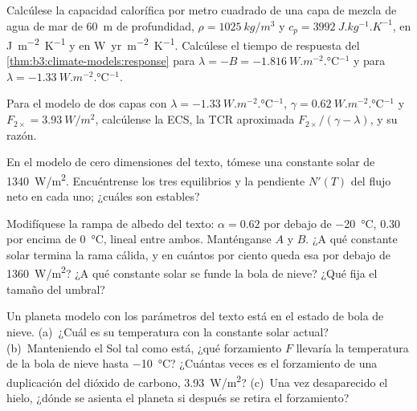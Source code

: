\begin{exercise}[$\star$]\label{exo:b3:climate-models:3}
Calcúlese la capacidad calorífica por metro cuadrado de una capa de mezcla de agua de mar
de \qty{60}{m} de profundidad, $\rho = \qty{1025}{kg/m^3}$ y $c_p = \qty{3992}{J.kg^{-1}.K^{-1}}$,
en \unit{J.m^{-2}.K^{-1}} y en \unit{W.yr.m^{-2}.K^{-1}}. Calcúlese el
tiempo de respuesta del \cref{thm:b3:climate-models:response} para $\lambda = -B =
\qty{-1.816}{W.m^{-2}.\celsius^{-1}}$ y para $\lambda =
\qty{-1.33}{W.m^{-2}.\celsius^{-1}}$.
\end{exercise}

\begin{exercise}[$\star$]\label{exo:b3:climate-models:4}
Para el modelo de dos capas con $\lambda = \qty{-1.33}{W.m^{-2}.\celsius^{-1}}$,
$\gamma = \qty{0.62}{W.m^{-2}.\celsius^{-1}}$ y $F_{2\times} =
\qty{3.93}{W/m^2}$, calcúlense la ECS, la TCR aproximada $F_{2\times}/
(\gamma - \lambda)$, y su razón.
\end{exercise}

\begin{exercise}[$\star\star$]\label{exo:b3:climate-models:5}
En el modelo de cero dimensiones del texto, tómese una constante solar de
\qty{1340}{W/m^2}. Encuéntrense los tres equilibrios y la pendiente $N'(T)$ del
flujo neto en cada uno; ¿cuáles son estables?
\end{exercise}

\begin{exercise}[$\star\star$]\label{exo:b3:climate-models:6}
Modifíquese la rampa de albedo del texto: $\alpha = 0.62$ por debajo de \qty{-20}{\celsius},
$0.30$ por encima de \qty{0}{\celsius}, lineal entre ambos. Manténganse $A$ y $B$. ¿A qué
constante solar termina la rama cálida, y en cuántos por ciento queda esa
por debajo de \qty{1360}{W/m^2}? ¿A qué constante solar se funde la bola de nieve?
¿Qué fija el tamaño del umbral?
\end{exercise}

\begin{exercise}[$\star\star$]\label{exo:b3:climate-models:7}
Un planeta modelo con los parámetros del texto está en el estado de bola de nieve.
(a)~¿Cuál es su temperatura con la constante solar actual? (b)~Manteniendo el Sol
tal como está, ¿qué forzamiento $F$ llevaría la temperatura de la bola de nieve hasta
\qty{-10}{\celsius}? ¿Cuántas veces es el forzamiento de una duplicación del dióxido de carbono,
\qty{3.93}{W/m^2}? (c)~Una vez desaparecido el hielo, ¿dónde se asienta el planeta
si después se retira el forzamiento?
\end{exercise}

